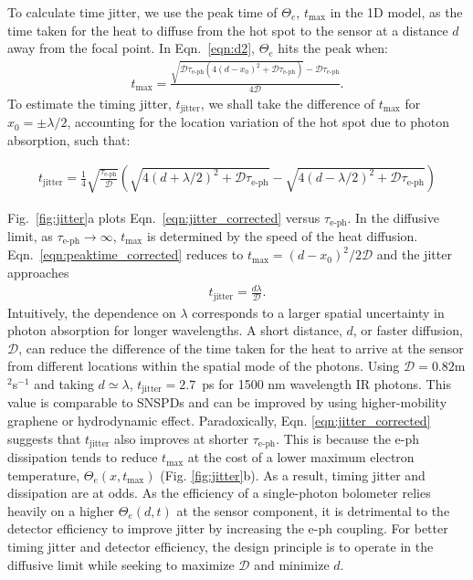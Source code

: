 \documentclass[aip, amsmath,amssymb, reprint]{revtex4-1}
\newcommand{\ba}{\begin{eqnarray}}
\newcommand{\ea}{\end{eqnarray}}
\begin{document}
To calculate time jitter, we use the peak time of $\Theta_e$, $t_{\text{max}}$ in the 1D model, as the time taken for the heat to diffuse from the hot spot to the sensor at a distance $d$ away from the focal point. In Eqn.~\ref{eqn:d2}, $\Theta_e$ hits the peak when: \ba t_{\text{max}} = \frac{\sqrt{\mathcal{D}\tau_{\text{e-ph}}\left(4(d-x_0)^2 + \mathcal{D}\tau_{\text{e-ph}}\right)} - \mathcal{D}\tau_{\text{e-ph}}}{4\mathcal{D}}. \label{eqn:peaktime_corrected} \ea To estimate the timing jitter, $t_{\text{jitter}}$, we shall take the difference of $t_{\text{max}}$ for $x_0 = \pm \lambda/2$, accounting for the location variation of the hot spot due to photon absorption, such that: \begin{widetext} \ba t_{\text{jitter}} = \frac{1}{4}\sqrt{\frac{\tau_{\text{e-ph}}}{\mathcal{D}}} \left(\sqrt{4(d+\lambda/2)^2 + \mathcal{D}\tau_{\text{e-ph}}} - \sqrt{4(d-\lambda/2)^2 + \mathcal{D}\tau_{\text{e-ph}}} \right) \label{eqn:jitter_corrected}\ea
\end{widetext}

Fig.~\ref{fig:jitter}a plots Eqn.~\ref{eqn:jitter_corrected} versus $\tau_{\text{e-ph}}$. In the diffusive limit, as $\tau_{\text{e-ph}} \rightarrow \infty$, $t_{\text{max}}$ is determined by the speed of the heat diffusion. Eqn.~\ref{eqn:peaktime_corrected} reduces to $t_{\text{max}} = (d - x_0)^2/2\mathcal{D}$ and the jitter approaches
\ba t_{\text{jitter}} = \frac{d\lambda}{\mathcal{D}}. \label{eqn:jitter}\ea
Intuitively, the dependence on $\lambda$ corresponds to a larger spatial uncertainty in photon absorption for longer wavelengths. A short distance, $d$, or faster diffusion, $\mathcal{D}$, can reduce the difference of the time taken for the heat to arrive at the sensor from different locations within the spatial mode of the photons. Using $\mathcal{D} = 0.82 $m$^2$s$^{-1}$ and taking $d \simeq \lambda$, $t_{\text{jitter}} = 2.7$~ps for 1500 nm wavelength IR photons. This value is comparable to SNSPDs\cite{Korzh.2020,Zadeh.2020} and can be improved by using higher-mobility graphene or hydrodynamic effect\cite{Lucas.201738q,Block.2021}. Paradoxically, Eqn. \ref{eqn:jitter_corrected} suggests that $t_{\text{jitter}}$ also improves at shorter $\tau_{\text{e-ph}}$. This is because the e-ph dissipation tends to reduce $t_{\text{max}}$ at the cost of a lower maximum electron temperature, $\Theta_e(x, t_{\text{max}})$ (Fig. \ref{fig:jitter}b). As a result, timing jitter and dissipation are at odds. As the efficiency of a single-photon bolometer relies heavily on a higher $\Theta_e(d, t)$ at the sensor component, it is detrimental to the detector efficiency to improve jitter by increasing the e-ph coupling. For better timing jitter and detector efficiency, the design principle is to operate in the diffusive limit while seeking to maximize $\mathcal{D}$ and minimize $d$.
\end{document}
